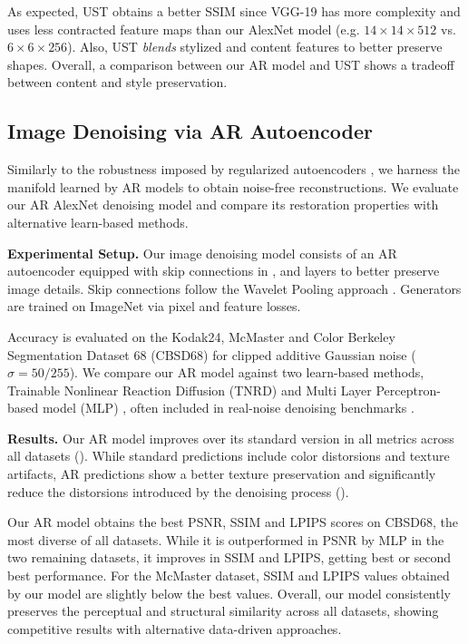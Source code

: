As expected, UST obtains a better SSIM since VGG-19 has more complexity and uses less contracted feature maps than our AlexNet model (e.g. $14 \times 14 \times 512$ vs. $6 \times 6 \times 256$). Also, UST \textit{blends} stylized and content features to better preserve shapes. Overall, a comparison between our AR model and UST shows a tradeoff between content and style preservation.

\subsection{Image Denoising via AR Autoencoder}
Similarly to the robustness imposed by regularized autoencoders \cite{vincent_2010_stacked,rifai2011contractive,kingma_2013_auto}, we harness the manifold learned by AR models to obtain noise-free reconstructions. We evaluate our AR AlexNet denoising model and compare its restoration properties with alternative learn-based methods.



\textbf{Experimental Setup.} Our image denoising model consists of an AR autoencoder equipped with skip connections in ,  and  layers to better preserve image details. Skip connections follow the Wavelet Pooling approach \cite{yoo_2019_photorealistic}. Generators are trained on ImageNet via pixel and feature losses.

Accuracy is evaluated on the Kodak24, McMaster \cite{zhang_2011_color} and Color Berkeley Segmentation Dataset 68 (CBSD68) \cite{MartinFTM01} for clipped additive Gaussian noise ($\sigma=50/255$). We compare our AR model against two learn-based methods, Trainable Nonlinear Reaction Diffusion (TNRD) \cite{chen_2016_trainable} and Multi Layer Perceptron-based model (MLP) \cite{burger_2012_image}, often included in real-noise denoising benchmarks \cite{anwar_2019_real,guo_2019_toward}.

\textbf{Results.}  Our AR model improves over its standard version in all metrics across all datasets (). While standard predictions include color distorsions and texture artifacts, AR predictions show a better texture preservation and significantly reduce the distorsions introduced by the denoising process ().

Our AR model obtains the best PSNR, SSIM and LPIPS scores on CBSD68, the most diverse of all datasets. While it is outperformed in PSNR by MLP in the two remaining datasets, it improves in SSIM and LPIPS, getting best or second best performance. For the McMaster dataset, SSIM and LPIPS values obtained by our model are slightly below the best values. Overall, our model consistently preserves the perceptual and structural similarity across all datasets, showing competitive results with alternative data-driven approaches.
